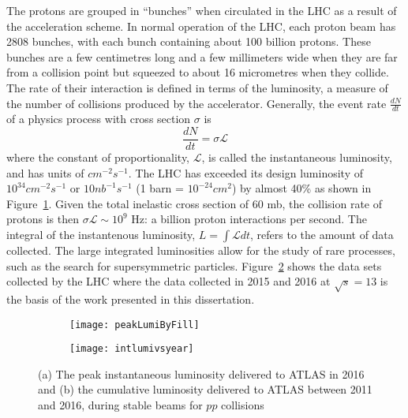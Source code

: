 The protons are grouped in ``bunches'' when circulated in the LHC as a result of the acceleration 
scheme.
In normal operation of the LHC, each proton beam has 2808 bunches, with each bunch containing 
about 100 billion protons. 
These bunches are a few centimetres long and a few millimeters wide when they are far from a 
collision point but squeezed to about 16 micrometres when they collide.
The rate of their interaction is defined in terms of the luminosity, a 
measure of the number of collisions produced by the accelerator.
Generally, the event rate $\frac{dN}{dt}$ of a physics process with cross section $\sigma$ is
\begin{equation}
\frac{dN}{dt} = \sigma  \mathcal{L} 
\label{eq:exp.lhc.lumi}
\end{equation}
where the constant of proportionality, $\mathcal{L}$, is called the instantaneous luminosity,
and has units of $cm^{-2}s^{-1}$.
The LHC has exceeded its design luminosity of $10^{34}cm^{-2}s^{-1}$ or $10 nb^{-1}s^{-1}$ (1 barn = $10^{-24} cm^2$) 
by almost 40\% as shown in Figure~\ref{fig:exp.lhc.peakLumiByFill}.
Given the total inelastic cross section of 60 mb, 
the collision rate of protons is then $ \sigma  \mathcal{L} \sim 10^9$ Hz: a billion proton
interactions per second.
The integral of the instantenous luminosity, $L = \int  \mathcal{L} dt$, refers to the amount 
of data collected. 
The large integrated luminosities allow for the study of rare processes, such as the search for 
supersymmetric particles.
Figure~\ref{fig:exp.lhc.intlumivsyear} shows the data sets collected by the LHC where 
the data collected in 2015 and 2016 at $\sqrt{s}=13$ \TeV is the basis of the work 
presented in this dissertation. 

\begin{figure}[!htb]
\centering
\begin{subfigure}[t]{0.48\textwidth}
\texttt{[image: peakLumiByFill]}
\subcaption{}
\label{fig:exp.lhc.peakLumiByFill}
\end{subfigure}
\begin{subfigure}[t]{0.48\textwidth}
\texttt{[image: intlumivsyear]}
\subcaption{}
\label{fig:exp.lhc.intlumivsyear}
\end{subfigure}
\vspace{-0.25cm}
\caption{(a) The peak instantaneous luminosity delivered to ATLAS in 2016
and (b) the cumulative luminosity delivered to ATLAS between 2011 and 2016, 
during stable beams for $pp$ collisions}
\label{fig:exp.lhc.peak}
\end{figure} 

